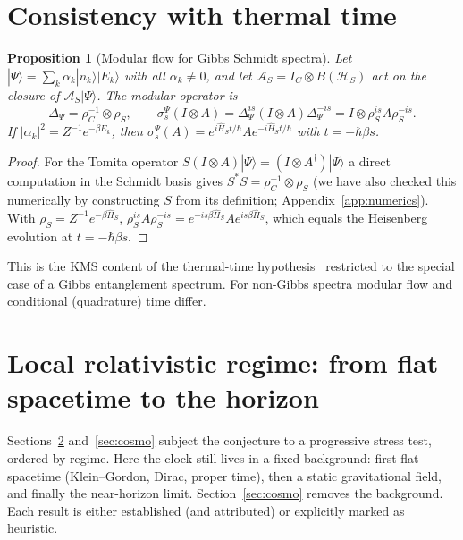 \documentclass[aps,prd,onecolumn,notitlepage,10pt,amsmath,amssymb,amsfonts,nofootinbib]{revtex4-2}
\newtheorem{proposition}{Proposition}
\theoremstyle{definition}
\theoremstyle{remark}
\newcommand{\Hil}{\mathcal{H}}
\newcommand{\Hs}{\widehat{H}_S}
\begin{document}
\section{Consistency with thermal time}
\label{sec:modular}

\begin{proposition}[Modular flow for Gibbs Schmidt spectra]
\label{prop:modular}
Let $|\Psi\rangle=\sum_k\alpha_k|n_k\rangle|E_k\rangle$ with all $\alpha_k\neq0$, and let $\mathcal A_S=I_C\otimes B(\Hil_S)$ act on the closure of $\mathcal A_S|\Psi\rangle$. The modular operator is
\begin{equation}
  \Delta_\Psi=\rho_C^{-1}\otimes\rho_S,\qquad \sigma_s^\Psi(I\otimes A)=\Delta_\Psi^{is}(I\otimes A)\Delta_\Psi^{-is}=I\otimes\rho_S^{is}A\rho_S^{-is}.
  \label{eq:modular}
\end{equation}
If $|\alpha_k|^2=Z^{-1}e^{-\beta E_k}$, then $\sigma_s^\Psi(A)=e^{i\Hs t/\hbar}Ae^{-i\Hs t/\hbar}$ with $t=-\hbar\beta s$.
\end{proposition}

\begin{proof}
For the Tomita operator $S(I\otimes A)|\Psi\rangle=(I\otimes A^\dagger)|\Psi\rangle$ a direct computation in the Schmidt basis gives $S^*S=\rho_C^{-1}\otimes\rho_S$ (we have also checked this numerically by constructing $S$ from its definition; Appendix~\ref{app:numerics}). With $\rho_S=Z^{-1}e^{-\beta\Hs}$, $\rho_S^{is}A\rho_S^{-is}=e^{-is\beta\Hs}Ae^{is\beta\Hs}$, which equals the Heisenberg evolution at $t=-\hbar\beta s$.
\end{proof}

This is the KMS content of the thermal-time hypothesis~\cite{ConnesRovelli1994} restricted to the special case of a Gibbs entanglement spectrum. For non-Gibbs spectra modular flow and conditional (quadrature) time differ.

\section{Local relativistic regime: from flat spacetime to the horizon}
\label{sec:relativistic}

Sections~\ref{sec:relativistic} and~\ref{sec:cosmo} subject the conjecture to a progressive stress test, ordered by regime. Here the clock still lives in a fixed background: first flat spacetime (Klein--Gordon, Dirac, proper time), then a static gravitational field, and finally the near-horizon limit. Section~\ref{sec:cosmo} removes the background. Each result is either established (and attributed) or explicitly marked as heuristic.
\end{document}
